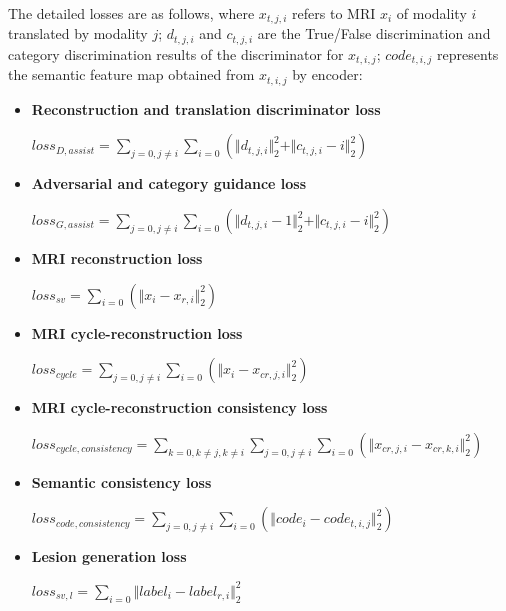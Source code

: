 \documentclass[letterpaper]{article} %
\begin{document}
The detailed losses are as follows, where $x_{t,j,i}$ refers to MRI $x_i$ of modality $i$ translated by modality $j$; $d_{t, j, i}$ and $c_{t, j, i}$ are the True/False discrimination and category discrimination results of the discriminator for $x_{t, i, j}$; $code_{t,i,j}$ represents the semantic feature map obtained from $x_{t,i,j}$ by encoder:
\begin{itemize}
	\item \textbf{Reconstruction and translation discriminator loss}
	\begin{center}
		$loss_{D,assist}=\sum\limits_{j=0,j\neq i}\sum\limits_{i=0}(\Vert{d_{t,j,i}}\Vert_{2}^{2}+\Vert{c_{t,j,i}-i}\Vert_{2}^{2})$
	\end{center}
	
	\item \textbf{Adversarial and category guidance loss}
	\begin{center}
		$loss_{G,assist}=\sum\limits_{j=0,j\neq i}\sum\limits_{i=0}(\Vert{d_{t,j,i}-1}\Vert_{2}^{2}+\Vert{c_{t,j,i}-i}\Vert_{2}^{2})$
	\end{center}
	
	\item \textbf{MRI reconstruction loss}
	\begin{center}
		$loss_{sv}=\sum\limits_{i=0}(\Vert{x_i-x_{r,i}}\Vert_{2}^{2})$
	\end{center}
	
	\item \textbf{MRI cycle-reconstruction loss}
	\begin{center}
		$loss_{cycle}=\sum\limits_{j=0,j\neq i}\sum\limits_{i=0}(\Vert{x_i-x_{cr,j,i}}\Vert_{2}^{2})$
	\end{center}
	
	\item \textbf{MRI cycle-reconstruction consistency loss}
	\begin{center}
		$loss_{cycle,consistency}=\sum\limits_{k=0,k\neq j,k\neq i}\sum\limits_{j=0,j\neq i}\sum\limits_{i=0}(\Vert{x_{cr,j,i}-x_{cr,k,i}}\Vert_{2}^{2})$
	\end{center}
	
	\item \textbf{Semantic consistency loss}
	\begin{center}
		$loss_{code,consistency}=\sum\limits_{j=0,j\neq i}\sum\limits_{i=0}(\Vert{code_i-code_{t,i,j}}\Vert_{2}^{2})$
	\end{center}
	
	\item \textbf{Lesion generation loss}
	\begin{center}
		$loss_{sv,l}=\sum\limits_{i=0}\Vert{label_i-label_{r,i}}\Vert_{2}^{2}$
	\end{center}
	
\end{itemize}
\end{document}
